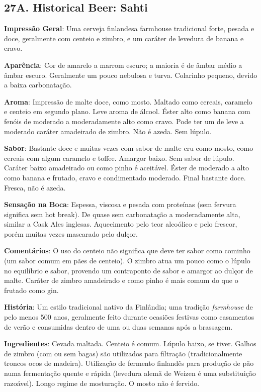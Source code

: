 \subsection*{27A. Historical Beer: Sahti}

\textbf{Impressão Geral}: Uma cerveja finlandesa farmhouse tradicional forte, pesada e doce, geralmente com centeio e zimbro, e um caráter de levedura de banana e cravo.

\textbf{Aparência}: Cor de amarelo a marrom escuro; a maioria é de âmbar médio a âmbar escuro. Geralmente um pouco nebulosa e turva. Colarinho pequeno, devido a baixa carbonatação.

\textbf{Aroma}: Impressão de malte doce, como mosto. Maltado como cereais, caramelo e centeio em segundo plano. Leve aroma de álcool. Éster alto como banana com fenóis de moderado a moderadamente alto como cravo. Pode ter um de leve a moderado caráter amadeirado de zimbro. Não é azeda. Sem lúpulo.

\textbf{Sabor}: Bastante doce e muitas vezes com sabor de malte cru como mosto, como cereais com algum caramelo e toffee. Amargor baixo. Sem sabor de lúpulo. Caráter baixo amadeirado ou como pinho é aceitável. Éster de moderado a alto como banana e frutado, cravo e condimentado moderado. Final bastante doce. Fresca, não é azeda.

\textbf{Sensação na Boca}: Espessa, viscosa e pesada com proteínas (sem fervura significa sem hot break). De quase sem carbonatação a moderadamente alta, similar a Cask Ales inglesas. Aquecimento pelo teor alcoólico e pelo frescor, porém muitas vezes mascarado pelo dulçor.

\textbf{Comentários}: O uso do centeio não significa que deve ter sabor como cominho (um sabor comum em pães de centeio). O zimbro atua um pouco como o lúpulo no equilíbrio e sabor, provendo um contraponto de sabor e amargor ao dulçor de malte. Caráter de zimbro amadeirado e como pinho é mais comum do que o frutado como gin.

\textbf{História}: Um estilo tradicional nativo da Finlândia; uma tradição \textit{farmhouse} de pelo menos 500 anos, geralmente feito durante ocasiões festivas como casamentos de verão e consumidas dentro de uma ou duas semanas após a brassagem.

\textbf{Ingredientes}: Cevada maltada. Centeio é comum. Lúpulo baixo, se tiver. Galhos de zimbro (com ou sem bagas) são utilizados para filtração (tradicionalmente troncos ocos de madeira). Utilização de fermento finlandês para produção de pão numa fermentação quente e rápida (levedura alemã de Weizen é uma substituição razoável). Longo regime de mosturação. O mosto não é fervido.

